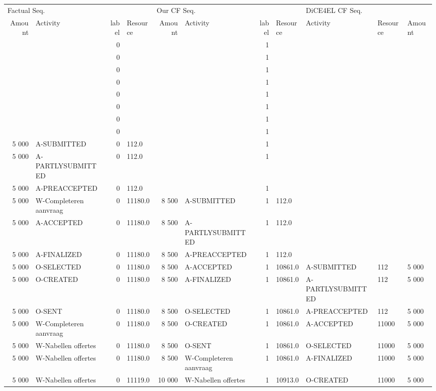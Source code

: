 \begin{tabular}{rlrlrlrllll}
\toprule
\multicolumn{4}{l}{Factual Seq.} & \multicolumn{4}{l}{Our CF Seq.} & \multicolumn{3}{l}{DiCE4EL CF Seq.} \\
Amount & Activity & label & Resource & Amount & Activity & label & Resource & Activity & Resource & Amount \\
\midrule
 &  & 0 &  &  &  & 1 &  &  &  &  \\
 &  & 0 &  &  &  & 1 &  &  &  &  \\
 &  & 0 &  &  &  & 1 &  &  &  &  \\
 &  & 0 &  &  &  & 1 &  &  &  &  \\
 &  & 0 &  &  &  & 1 &  &  &  &  \\
 &  & 0 &  &  &  & 1 &  &  &  &  \\
 &  & 0 &  &  &  & 1 &  &  &  &  \\
 &  & 0 &  &  &  & 1 &  &  &  &  \\
5 000 & A-SUBMITTED & 0 & 112.0 &  &  & 1 &  &  &  &  \\
5 000 & A-PARTLYSUBMITTED & 0 & 112.0 &  &  & 1 &  &  &  &  \\
5 000 & A-PREACCEPTED & 0 & 112.0 &  &  & 1 &  &  &  &  \\
5 000 & W-Completeren aanvraag & 0 & 11180.0 & 8 500 & A-SUBMITTED & 1 & 112.0 &  &  &  \\
5 000 & A-ACCEPTED & 0 & 11180.0 & 8 500 & A-PARTLYSUBMITTED & 1 & 112.0 &  &  &  \\
5 000 & A-FINALIZED & 0 & 11180.0 & 8 500 & A-PREACCEPTED & 1 & 112.0 &  &  &  \\
5 000 & O-SELECTED & 0 & 11180.0 & 8 500 & A-ACCEPTED & 1 & 10861.0 & A-SUBMITTED & 112 & 5 000 \\
5 000 & O-CREATED & 0 & 11180.0 & 8 500 & A-FINALIZED & 1 & 10861.0 & A-PARTLYSUBMITTED & 112 & 5 000 \\
5 000 & O-SENT & 0 & 11180.0 & 8 500 & O-SELECTED & 1 & 10861.0 & A-PREACCEPTED & 112 & 5 000 \\
5 000 & W-Completeren aanvraag & 0 & 11180.0 & 8 500 & O-CREATED & 1 & 10861.0 & A-ACCEPTED & 11000 & 5 000 \\
5 000 & W-Nabellen offertes & 0 & 11180.0 & 8 500 & O-SENT & 1 & 10861.0 & O-SELECTED & 11000 & 5 000 \\
5 000 & W-Nabellen offertes & 0 & 11180.0 & 8 500 & W-Completeren aanvraag & 1 & 10861.0 & A-FINALIZED & 11000 & 5 000 \\
5 000 & W-Nabellen offertes & 0 & 11119.0 & 10 000 & W-Nabellen offertes & 1 & 10913.0 & O-CREATED & 11000 & 5 000 \\

\end{tabular}
